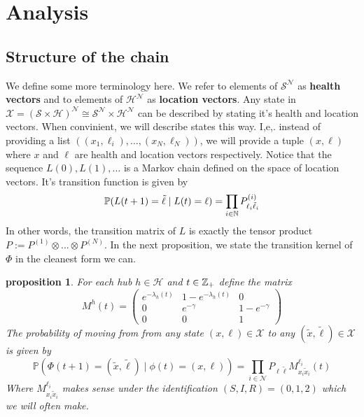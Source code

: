 \documentclass[a4paper]{article}
\newtheorem{prop}[theorem]{proposition}
\begin{document}
	\section{Analysis}
	\subsection{Structure of the chain}
	We define some more terminology here. We refer to elements of $\mathcal{S}^{\mathcal{N}}$ as \textbf{health vectors} and to elements of $\mathcal{H}^{\mathcal{N}}$ as \textbf{location vectors}. Any state in $\mathcal{X} = (\mathcal{S} \times \mathcal{H})^{\mathcal{N}} \cong \mathcal{S}^{\mathcal{N}} \times \mathcal{H}^{\mathcal{N}}$ can be described by stating it's health and location vectors. When convinient, we will describe states this way. I,e,. instead of providing a list $((x_{1}, \ell_{i}), \dots, (x_{N}, \ell_{N}))$, we will provide a tuple $(x, \ell)$ where $x$ and $\ell$ are health and location vectors respectively. Notice that the sequence $L(0), L(1), \dots$ is a Markov chain defined on the space of location vectors. It's transition function is given by 
	$$\mathbb{P}(L(t + 1) = \tilde{\ell} \mid L(t) = \ell) = \prod_{i \in \mathcal{\mathbb{N}}}P^{(i)}_{\ell_{i}\tilde{\ell}_{i}}$$
	In other words, the transition matrix of $L$ is exactly the tensor product $P := P^{(1)} \otimes \dots \otimes P^{(N)}$. In the next proposition, we state the transition kernel of $\Phi$ in the cleanest form we can.
	\begin{prop}
		For each hub $h \in \mathcal{H}$ and $t \in \mathbb{Z}_{+}$ define the matrix
		$$M^{h}(t) = \begin{pmatrix}
			e^{-\lambda_{h}(t)} & 1 - e^{-\lambda_{h}(t)} & 0\\
			0 & e^{-\gamma} & 1 - e^{-\gamma}\\
			0  & 0 & 1
		\end{pmatrix}$$
		The probability of moving from from any state $(x, \ell) \in \mathcal{X}$ to any $(\tilde{x}, \tilde{\ell}) \in \mathcal{X}$ is given by
		$$\mathbb{P}(\Phi(t + 1) = (\tilde{x}, \tilde{\ell}) \mid \phi(t) = (x, \ell)) = \prod_{i \in \mathcal{N}}P_{\ell \tilde{\ell}}M^{\ell_{i}}_{x_{i}\tilde{x}_{i}}(t)$$
		Where $M^{\ell_{i}}_{x_{i}\tilde{x}_{i}}$ makes sense under the identification $(S, I, R) = (0, 1, 2)$ which we will often make.
	\end{prop}
\end{document}
